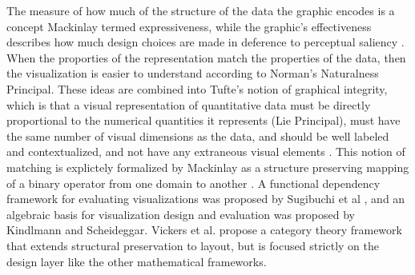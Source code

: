 \documentclass[../main.tex]{subfiles}
\begin{document}
The measure of how much of the structure of the data the graphic encodes is a concept Mackinlay termed expressiveness, while the graphic's effectiveness describes how much design choices are made in deference to perceptual saliency \cite{clevelandResearchStatisticalGraphics1987,clevelandGraphicalPerceptionTheory1984,chambersGraphicalMethodsData1983a, munznerVisualizationAnalysisDesign2014}. When the proporties of the representation match the properties of the data, then the visualization is easier to understand according to Norman's Naturalness Principal\cite{NaturalnessPrincipleInfoVis}. These ideas are combined into Tufte's notion of graphical integrity, which is that a visual representation of quantitative data must be directly proportional to the numerical quantities it represents (Lie Principal), must have the same number of visual dimensions as the data, and should be well labeled and contextualized, and not have any extraneous visual elements \cite{tufteVisualDisplayQuantitative2001}. This notion of matching is explictely formalized by Mackinlay as a structure preserving mapping of a binary operator from one domain to another \cite{mackinlayAUTOMATICDESIGNGRAPHICAL1987}. A functional dependency framework for evaluating visualizations was proposed by Sugibuchi et al \cite{sugibuchiFramwork2009}, and an algebraic basis for visualization design and evaluation was proposed by Kindlmann and Scheideggar\cite{kindlmann2014algebraic}. Vickers et al. propose a category theory framework\cite{vickersUnderstandingViz2013} that extends structural preservation to layout, but is focused strictly on the design layer like the other mathematical frameworks.
\end{document}
